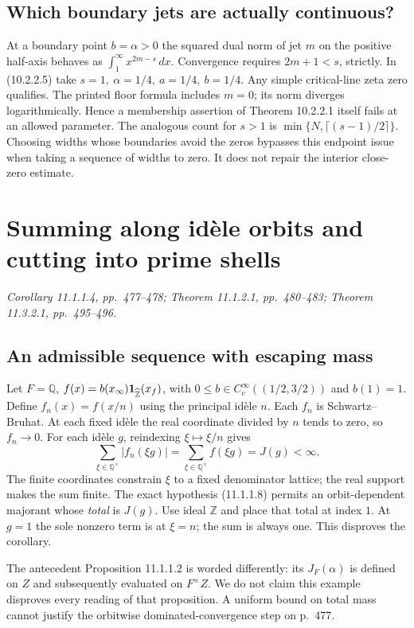 \documentclass[11pt,reqno]{amsart}
\numberwithin{equation}{section}
\newcommand{\Q}{\mathbb Q}\newcommand{\R}{\mathbb R}\newcommand{\C}{\mathbb C}\newcommand{\Z}{\mathbb Z}
\begin{document}
\subsection*{Which boundary jets are actually continuous?}
At a boundary point \(b=\alpha>0\) the squared dual norm of jet \(m\) on the positive half-axis behaves as \(\int_1^\infty x^{2m-s}\,dx\). Convergence requires \(2m+1<s\), strictly. In (10.2.2.5) take \(s=1,\ \alpha=1/4,\ a=1/4,\ b=1/4\). Any simple critical-line zeta zero qualifies. The printed floor formula includes \(m=0\); its norm diverges logarithmically. Hence a membership assertion of Theorem 10.2.2.1 itself fails at an allowed parameter. The analogous count for \(s>1\) is \(\min\{N,\lceil(s-1)/2\rceil\}\). Choosing widths whose boundaries avoid the zeros bypasses this endpoint issue when taking a sequence of widths to zero. It does not repair the interior close-zero estimate.


\section{Summing along idèle orbits and cutting into prime shells}\label{sec:8}

\textit{Corollary 11.1.1.4, pp.~477--478; Theorem 11.1.2.1, pp.~480--483; Theorem 11.3.2.1, pp.~495--496.}\par
\subsection*{An admissible sequence with escaping mass}
Let \(F=\Q\), \(f(x)=b(x_\infty)\id_{\widehat{\Z}}(x_f)\), with \(0\le b\in C_c^\infty((1/2,3/2))\) and \(b(1)=1\). Define \(f_n(x)=f(x/n)\) using the principal idèle \(n\). Each \(f_n\) is Schwartz--Bruhat. At each fixed idèle the real coordinate divided by \(n\) tends to zero, so \(f_n\to0\). For each idèle \(g\), reindexing \(\xi\mapsto\xi/n\) gives
\[
     \sum_{\xi\in\Q^\times}|f_n(\xi g)|=\sum_{\xi\in\Q^\times}f(\xi g)=J(g)<\infty .
\]
The finite coordinates constrain \(\xi\) to a fixed denominator lattice; the real support makes the sum finite. The exact hypothesis (11.1.1.8) permits an orbit-dependent majorant whose \emph{total} is \(J(g)\). Use ideal \(\Z\) and place that total at index \(1\). At \(g=1\) the sole nonzero term is at \(\xi=n\); the sum is always one. This disproves the corollary.

The antecedent Proposition 11.1.1.2 is worded differently: its \(J_F(\alpha)\) is defined on \(Z\) and subsequently evaluated on \(F^\times Z\). We do not claim this example disproves every reading of that proposition. A uniform bound on total mass cannot justify the orbitwise dominated-convergence step on p.~477.
\end{document}
